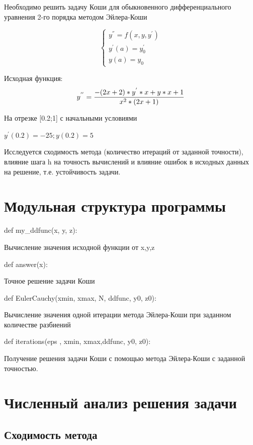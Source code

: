  Необходимо решить задачу Коши для обыкновенного дифференциального уравнения 2-го порядка методом Эйлера-Коши
 
 \begin{equation}
 	\begin{cases}
 		y^{''}=f(x,y,y^{'}) \\
 		y^{'}(a)=y_{0}^{'} \\
 		y(a) = y_{0} 	
 	\end{cases}
 \end{equation}
 
 Исходная функция: 
 \begin{equation}
 	y^{''}=\frac{-(2x+2)*y^{'}*x+y*x+1}{x^{2}*(2x+1)} \\
 \end{equation}
 
 На отрезке [0.2;1] с начальными условиями
 
 \begin{math}
 	y^{'}(0.2)=-25 ;
 	y(0.2) = 5 
 \end{math}

Исследуется сходимость метода (количество итераций от заданной точности), влияние шага h на точность вычислений и влияние ошибок в исходных данных на решение, т.е. устойчивость задачи.

\section{Модульная структура программы}

def my\_ddfunc(x, y, z):

Вычисление значения исходной функции от x,y,z

def answer(x):

Точное решение задачи Коши

def EulerCauchy(xmin, xmax, N, ddfunc, y0, z0):

Вычисление значения одной итерации метода Эйлера-Коши при заданном количестве разбиений

def iterations(eps , xmin, xmax,ddfunc, y0, z0):

Получение решения задачи Коши с помощью метода Эйлера-Коши с заданной точностью. 

\section{Численный анализ решения задачи}

\subsection{Сходимость метода}

